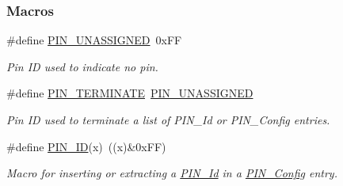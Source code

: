 \subsubsection*{Macros}
\begin{DoxyCompactItemize}
\item 
\#define \hyperlink{_p_i_n_8h_aba219226dfdc9ea2fb82d6a7995395bf}{P\+I\+N\+\_\+\+U\+N\+A\+S\+S\+I\+G\+N\+E\+D}~0x\+F\+F
\begin{DoxyCompactList}\small\item\em Pin I\+D used to indicate no pin. \end{DoxyCompactList}\item 
\#define \hyperlink{_p_i_n_8h_ae22ec44ad92ee130a665ca56aad38c75}{P\+I\+N\+\_\+\+T\+E\+R\+M\+I\+N\+A\+T\+E}~\hyperlink{_p_i_n_8h_aba219226dfdc9ea2fb82d6a7995395bf}{P\+I\+N\+\_\+\+U\+N\+A\+S\+S\+I\+G\+N\+E\+D}
\begin{DoxyCompactList}\small\item\em Pin I\+D used to terminate a list of P\+I\+N\+\_\+\+Id or P\+I\+N\+\_\+\+Config entries. \end{DoxyCompactList}\item 
\#define \hyperlink{_p_i_n_8h_add47c82f7563d28053f76d368d344bc6}{P\+I\+N\+\_\+\+I\+D}(x)~((x)\&0x\+F\+F)
\begin{DoxyCompactList}\small\item\em Macro for inserting or extracting a \hyperlink{_p_i_n_8h_a9ae8197f460bb76ea09a84f47d09921f}{P\+I\+N\+\_\+\+Id} in a \hyperlink{_p_i_n_8h_ae427b7d2925f9b0f3145e455cfdb5841}{P\+I\+N\+\_\+\+Config} entry. \end{DoxyCompactList}\end{DoxyCompactItemize}
